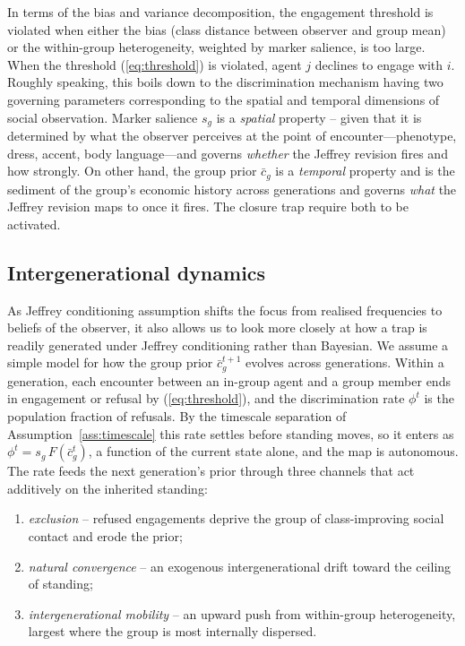 \documentclass[pdflatex,sn-basic]{sn-jnl}
\theoremstyle{thmstyleone}
\numberwithin{proposition}{subsection}
\begin{document}
In terms of the bias and variance decomposition, the engagement threshold is violated when either the bias (class
distance between observer and group mean) or the within-group
heterogeneity, weighted by marker salience, is too
large. When the threshold (\ref{eq:threshold}) is violated, agent
$j$ declines to engage with $i$. Roughly speaking, this boils down to the discrimination mechanism having two governing
parameters corresponding to the spatial and temporal dimensions of
social observation. Marker salience $s_g$ is a
\emph{spatial} property -- given that it is determined by what the observer
perceives at the point of encounter---phenotype, dress, accent, body
language---and governs \emph{whether} the Jeffrey revision fires and
how strongly. On other hand, the group prior $\bar{c}_g$ is a \emph{temporal}
property and is the sediment of the group's economic history across
generations and governs \emph{what} the Jeffrey revision maps to
once it fires. The closure trap require both to be activated.


\subsection{Intergenerational dynamics}
\label{subsec:dynamics}

As Jeffrey conditioning assumption shifts the focus from realised frequencies to beliefs of the observer, it also allows us to look more closely at how a trap is readily generated under Jeffrey conditioning rather than Bayesian. We assume a simple model for how the group prior $\bar{c}_g^{t+1}$ evolves across
generations. Within a generation, each encounter between an in-group
agent and a group member ends in engagement or refusal by
(\ref{eq:threshold}), and the discrimination rate $\phi^t$ is the
population fraction of refusals. By the timescale separation of
Assumption~\ref{ass:timescale} this rate settles before standing moves,
so it enters as $\phi^t = s_g\,F(\bar{c}_g^t)$, a function of the current
state alone, and the map is autonomous. The rate feeds the next
generation's prior through three channels that act additively on the
inherited standing:
\begin{enumerate}
\item \emph{exclusion} -- refused engagements deprive the group of
class-improving social contact and erode the prior;
\item \emph{natural convergence} -- an exogenous intergenerational drift
toward the ceiling of standing;
\item \emph{intergenerational mobility} -- an upward push from
within-group heterogeneity, largest where the group is most internally
dispersed.
\end{enumerate}
\end{document}
